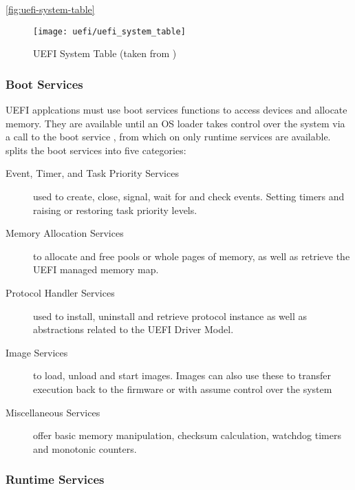 \autoref{fig:uefi-system-table}



\begin{figure}[htb]%
    \centering%
    \texttt{[image: uefi/uefi\_system\_table]}%
    \caption{\ac{UEFI} System Table (taken from \cite[Vol 2, Figure 2-5]{pi-spec})}%
    \label{fig:uefi-system-table}%
\end{figure}


\subsubsection{Boot Services}

\ac{UEFI} applcations must use boot services functions to access devices and allocate memory. They are available until an \ac{OS} loader takes control over the system via a call to the boot service , from which on only runtime services are available. \cite[Section 7]{uefi-spec} splits the boot services into five categories:

\begin{description}
    \item [Event, Timer, and Task Priority Services] used to create, close, signal, wait for and check events. Setting timers and raising or restoring task priority levels.
    \item [Memory Allocation Services] to allocate and free pools or whole pages of memory, as well as retrieve the \ac{UEFI} managed memory map.
    \item [Protocol Handler Services] used to install, uninstall and retrieve protocol instance as well as abstractions related to the \ac{UEFI} Driver Model.
    \item [Image Services] to load, unload and start images. Images can also use these to transfer execution back to the firmware or with  assume control over the system
    \item [Miscellaneous Services] offer basic memory manipulation, checksum calculation, watchdog timers and monotonic counters.
\end{description}

\subsubsection{Runtime Services}


